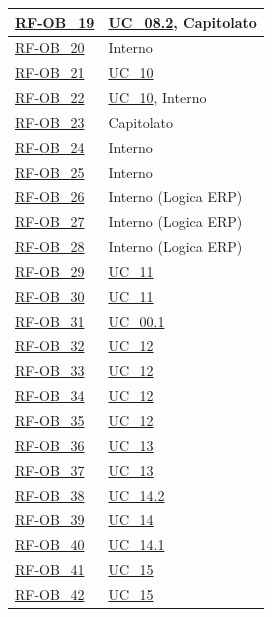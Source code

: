 \begin{longtable}{|>{\raggedright}p{}|>{\raggedright\arraybackslash}p{}|}
    \hyperlink{rf-ob_19}{RF-OB\_19} & \hyperref[uc_08.2]{UC\_08.2}, Capitolato \\ \hline
    \hyperlink{rf-ob_20}{RF-OB\_20} & Interno \\ \hline
    \hyperlink{rf-ob_21}{RF-OB\_21} & \hyperref[uc_10]{UC\_10} \\ \hline
    \hyperlink{rf-ob_22}{RF-OB\_22} & \hyperref[uc_10]{UC\_10}, Interno \\ \hline
    \hyperlink{rf-ob_23}{RF-OB\_23} & Capitolato \\ \hline
    \hyperlink{rf-ob_24}{RF-OB\_24} & Interno \\ \hline
    \hyperlink{rf-ob_25}{RF-OB\_25} & Interno \\ \hline
    \hyperlink{rf-ob_26}{RF-OB\_26} & Interno (Logica ERP) \\ \hline
    \hyperlink{rf-ob_27}{RF-OB\_27} & Interno (Logica ERP) \\ \hline
    \hyperlink{rf-ob_28}{RF-OB\_28} & Interno (Logica ERP) \\ \hline
    \hyperlink{rf-ob_29}{RF-OB\_29} & \hyperref[uc_11]{UC\_11} \\ \hline
    \hyperlink{rf-ob_30}{RF-OB\_30} & \hyperref[uc_11]{UC\_11} \\ \hline
    \hyperlink{rf-ob_31}{RF-OB\_31} & \hyperref[uc_00.1]{UC\_00.1} \\ \hline
    \hyperlink{rf-ob_32}{RF-OB\_32} & \hyperref[uc_12]{UC\_12} \\ \hline
    \hyperlink{rf-ob_33}{RF-OB\_33} & \hyperref[uc_12]{UC\_12} \\ \hline
    \hyperlink{rf-ob_34}{RF-OB\_34} & \hyperref[uc_12]{UC\_12} \\ \hline
    \hyperlink{rf-ob_35}{RF-OB\_35} & \hyperref[uc_12]{UC\_12} \\ \hline
    \hyperlink{rf-ob_36}{RF-OB\_36} & \hyperref[uc_13]{UC\_13} \\ \hline
    \hyperlink{rf-ob_37}{RF-OB\_37} & \hyperref[uc_13]{UC\_13} \\ \hline
    \hyperlink{rf-ob_38}{RF-OB\_38} & \hyperref[uc_14.2]{UC\_14.2} \\ \hline
    \hyperlink{rf-ob_39}{RF-OB\_39} & \hyperref[uc_14]{UC\_14} \\ \hline
    \hyperlink{rf-ob_40}{RF-OB\_40} & \hyperref[uc_14.1]{UC\_14.1} \\ \hline
    \hyperlink{rf-ob_41}{RF-OB\_41} & \hyperref[uc_15]{UC\_15} \\ \hline
    \hyperlink{rf-ob_42}{RF-OB\_42} & \hyperref[uc_15]{UC\_15} \\ \hline

\end{longtable}

